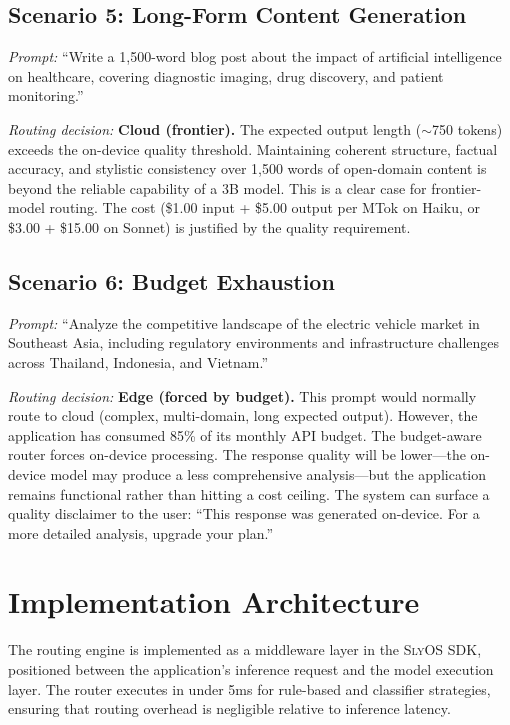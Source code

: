 \documentclass[12pt, letterpaper, twoside]{report}
\newcommand{\slyos}{\textsc{SlyOS}\xspace}
\begin{document}
\subsection{Scenario 5: Long-Form Content Generation}

\textit{Prompt:} ``Write a 1,500-word blog post about the impact of artificial intelligence on healthcare, covering diagnostic imaging, drug discovery, and patient monitoring.''

\textit{Routing decision:} \textbf{Cloud (frontier).} The expected output length ($\sim$750 tokens) exceeds the on-device quality threshold. Maintaining coherent structure, factual accuracy, and stylistic consistency over 1,500 words of open-domain content is beyond the reliable capability of a 3B model. This is a clear case for frontier-model routing. The cost (\$1.00 input + \$5.00 output per MTok on Haiku, or \$3.00 + \$15.00 on Sonnet) is justified by the quality requirement.

\subsection{Scenario 6: Budget Exhaustion}

\textit{Prompt:} ``Analyze the competitive landscape of the electric vehicle market in Southeast Asia, including regulatory environments and infrastructure challenges across Thailand, Indonesia, and Vietnam.''

\textit{Routing decision:} \textbf{Edge (forced by budget).} This prompt would normally route to cloud (complex, multi-domain, long expected output). However, the application has consumed 85\% of its monthly API budget. The budget-aware router forces on-device processing. The response quality will be lower---the on-device model may produce a less comprehensive analysis---but the application remains functional rather than hitting a cost ceiling. The system can surface a quality disclaimer to the user: ``This response was generated on-device. For a more detailed analysis, upgrade your plan.''

\section{Implementation Architecture}
\label{sec:routing_impl}

The routing engine is implemented as a middleware layer in the \slyos SDK, positioned between the application's inference request and the model execution layer. The router executes in under 5ms for rule-based and classifier strategies, ensuring that routing overhead is negligible relative to inference latency.
\end{document}

